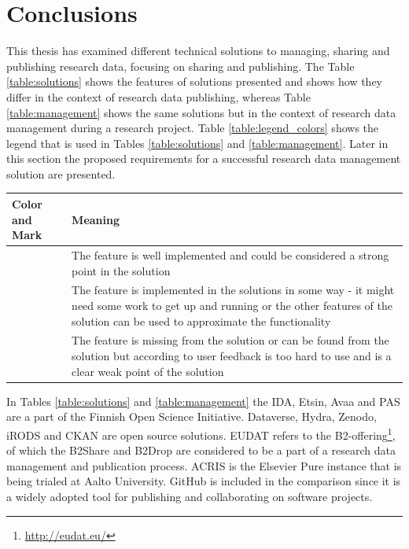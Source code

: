 \chapter{Conclusions}
\label{chapter:conclusions}

This thesis has examined different technical solutions to managing, sharing and
publishing research data, focusing on sharing and publishing. The Table
\ref{table:solutions} shows the features of solutions presented and shows
how they differ in the context of research data publishing, whereas Table
\ref{table:management} shows the same solutions but in the context of research
data management during a research project. Table
\ref{table:legend_colors} shows the legend that is used in Tables
\ref{table:solutions} and \ref{table:management}. Later in this section the
proposed requirements for a successful research data management solution
are presented.

\addtocounter{table}{-1}
\label{table:legend_colors}
    \begin{tabularx}{\textwidth}{| >{\raggedright}p{3cm} | X |}
    \hline
    \textbf{Color and Mark} & \textbf{Meaning} \\
    \hline
    \multicolumn{1}{|c|}{\cellcolor{green}++} & The feature is well implemented and could be considered a strong point
                          in the solution \\
    \hline
    \multicolumn{1}{|c|}{\cellcolor{yellow}+} & The feature is implemented in the solutions in some way - it might need
                          some work to get up and running or the other features of the solution can be used to
                          approximate the functionality \\
    \hline
    \multicolumn{1}{|c|}{\cellcolor{red}-}    & The feature is missing from the solution or can be found from the solution but according
                          to user feedback is too hard to use and is a clear weak point of the solution \\
    \hline
\end{tabularx}

In Tables \ref{table:solutions} and \ref{table:management} the IDA, Etsin, Avaa and PAS are a part of the
Finnish Open Science Initiative. Dataverse, Hydra, Zenodo, iRODS and CKAN are
open source solutions. EUDAT refers to the B2-offering\footnote{\url{http://eudat.eu/}},
of which the B2Share and B2Drop are considered to be a part of a research
data management and publication process. ACRIS is the Elsevier Pure instance
that is being trialed at Aalto University. GitHub is included in the
comparison since it is a widely adopted tool for publishing and collaborating
on software projects.

